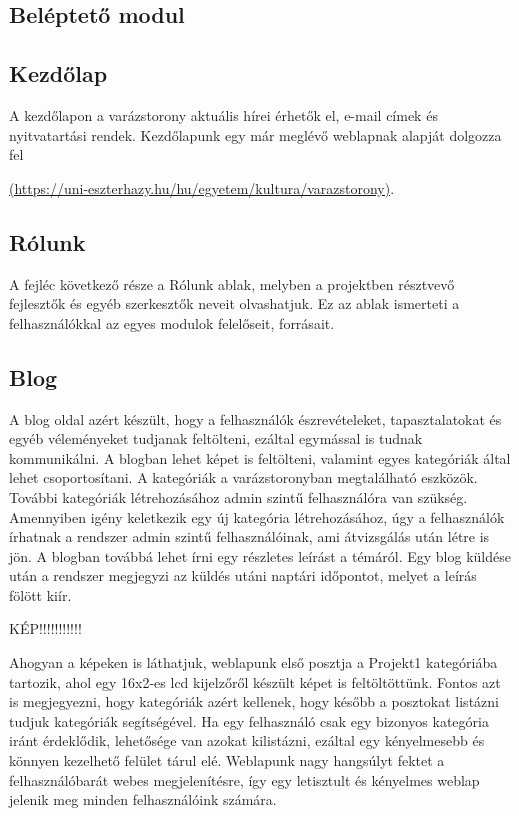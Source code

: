 \documentclass[
]{thesis-ekf}
\theoremstyle{definition}
\theoremstyle{remark}
\begin{document}
			
			
		\subsection{Beléptető modul}
		\subsection{Kezdőlap}
			A kezdőlapon a varázstorony aktuális hírei érhetők el, e-mail címek és nyitvatartási rendek. Kezdőlapunk egy már meglévő weblapnak alapját dolgozza fel
			\par \url{(https://uni-eszterhazy.hu/hu/egyetem/kultura/varazstorony)}.
		\subsection{Rólunk}
			\par A fejléc következő része a Rólunk ablak, melyben a projektben résztvevő fejlesztők és egyéb szerkesztők neveit olvashatjuk. Ez az ablak ismerteti a felhasználókkal az egyes modulok felelőseit, forrásait.
		\subsection{Blog}
			\par A blog oldal azért készült, hogy a felhasználók észrevételeket, tapasztalatokat és egyéb véleményeket tudjanak feltölteni, ezáltal egymással is tudnak kommunikálni. A blogban lehet képet is feltölteni, valamint egyes kategóriák által lehet csoportosítani. A kategóriák a varázstoronyban megtalálható eszközök. További kategóriák létrehozásához admin szintű felhasználóra van szükség. Amennyiben igény keletkezik egy új kategória létrehozásához, úgy a felhasználók írhatnak a rendszer admin szintű felhasználóinak, ami átvizsgálás után létre is jön. A blogban továbbá lehet írni egy részletes leírást a témáról. Egy blog küldése után a rendszer megjegyzi az küldés utáni naptári időpontot, melyet a leírás fölött kiír.
			\par KÉP!!!!!!!!!!!
			\par Ahogyan a képeken is láthatjuk, weblapunk első posztja a Projekt1 kategóriába tartozik, ahol egy 16x2-es lcd kijelzőről készült képet is feltöltöttünk. Fontos azt is megjegyezni, hogy kategóriák azért kellenek, hogy később a posztokat listázni tudjuk kategóriák segítségével. Ha egy felhasználó csak egy bizonyos kategória iránt érdeklődik, lehetősége van azokat kilistázni, ezáltal egy kényelmesebb és könnyen kezelhető felület tárul elé. Weblapunk nagy hangsúlyt fektet a felhasználóbarát webes megjelenítésre, így egy letisztult és kényelmes weblap jelenik meg minden felhasználóink számára.
\end{document}
